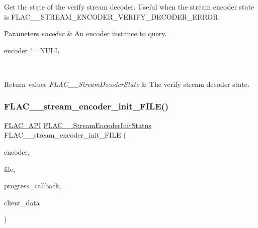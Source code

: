 Get the state of the verify stream decoder. Useful when the stream encoder state is {\ttfamily F\+L\+A\+C\+\_\+\+\_\+\+S\+T\+R\+E\+A\+M\+\_\+\+E\+N\+C\+O\+D\+E\+R\+\_\+\+V\+E\+R\+I\+F\+Y\+\_\+\+D\+E\+C\+O\+D\+E\+R\+\_\+\+E\+R\+R\+OR}.


\begin{DoxyParams}{Parameters}
{\em encoder} & An encoder instance to query.  
\begin{DoxyCode}
encoder != NULL 
\end{DoxyCode}
 \\
\hline
\end{DoxyParams}

\begin{DoxyRetVals}{Return values}
{\em F\+L\+A\+C\+\_\+\+\_\+\+Stream\+Decoder\+State} & The verify stream decoder state. \\
\hline
\end{DoxyRetVals}
\mbox{\label{group__flac__stream__encoder_ga78653fea5d9bc490fff34e3ef86de944}} 
\subsubsection{\texorpdfstring{F\+L\+A\+C\+\_\+\+\_\+stream\+\_\+encoder\+\_\+init\+\_\+\+F\+I\+L\+E()}{FLAC\_\_stream\_encoder\_init\_FILE()}}
{\footnotesize\ttfamily \hyperlink{group__flac__export_ga56ca07df8a23310707732b1c0007d6f5}{F\+L\+A\+C\+\_\+\+A\+PI} \hyperlink{group__flac__stream__encoder_ga3bb869620af2b188d77982a5c30b047d}{F\+L\+A\+C\+\_\+\+\_\+\+Stream\+Encoder\+Init\+Status} F\+L\+A\+C\+\_\+\+\_\+stream\+\_\+encoder\+\_\+init\+\_\+\+F\+I\+LE (\begin{DoxyParamCaption}\item[{\hyperlink{struct_f_l_a_c_____stream_encoder}{F\+L\+A\+C\+\_\+\+\_\+\+Stream\+Encoder} $\ast$}]{encoder,  }\item[{F\+I\+LE $\ast$}]{file,  }\item[{\hyperlink{group__flac__stream__encoder_ga6e051c0e5837433f9e7cd56cd42ca6ba}{F\+L\+A\+C\+\_\+\+\_\+\+Stream\+Encoder\+Progress\+Callback}}]{progress\+\_\+callback,  }\item[{\hyperlink{png_8h_ac9c84fa68bbad002983e35ce3663c686}{void} $\ast$}]{client\+\_\+data }\end{DoxyParamCaption})}

